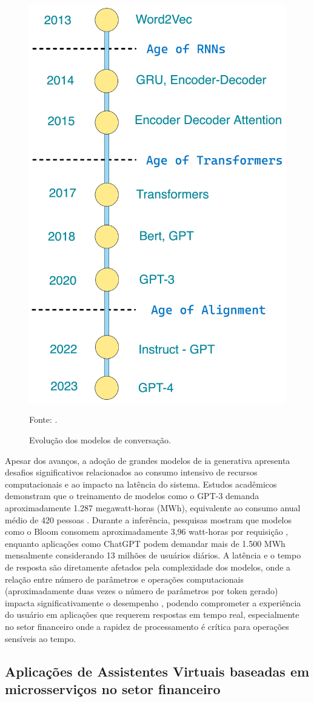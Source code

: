 \begin{figure}[H]
    \caption{Evolução dos modelos de conversação.}
    \label{fig:transformers}
    \centering
    \includegraphics[width=0.3\linewidth]{imagens/4-transformers.png}    
    {\par \raggedright \footnotesize Fonte: \textcite{dsacademy_llms_2023}.\par}
\end{figure}

Apesar dos avanços, a adoção de grandes modelos de \gls{ia} generativa apresenta desafios significativos relacionados ao consumo intensivo de recursos computacionais e ao impacto na latência do sistema. Estudos acadêmicos demonstram que o treinamento de modelos como o GPT-3 demanda aproximadamente 1.287 megawatt-horas (MWh), equivalente ao consumo anual médio de 420 pessoas \cite{argerich_measuring_2024}. Durante a inferência, pesquisas mostram que modelos como o Bloom consomem aproximadamente 3,96 watt-horas por requisição \cite{argerich_measuring_2024}, enquanto aplicações como ChatGPT podem demandar mais de 1.500 MWh mensalmente considerando 13 milhões de usuários diários. A latência e o tempo de resposta são diretamente afetados pela complexidade dos modelos, onde a relação entre número de parâmetros e operações computacionais (aproximadamente duas vezes o número de parâmetros por token gerado) impacta significativamente o desempenho \cite{argerich_measuring_2024}, podendo comprometer a experiência do usuário em aplicações que requerem respostas em tempo real, especialmente no setor financeiro onde a rapidez de processamento é crítica para operações sensíveis ao tempo.


\subsection{Aplicações de Assistentes Virtuais baseadas em microsserviços no setor financeiro}


